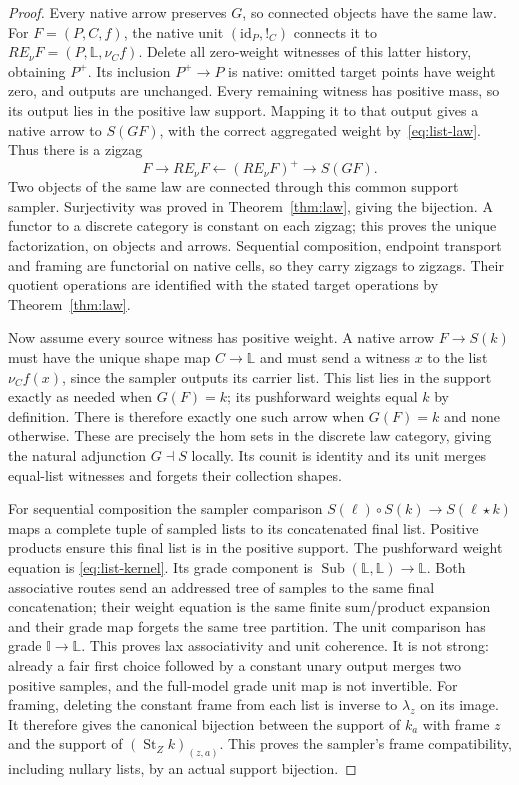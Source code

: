\documentclass[11pt,a4paper]{article}
\theoremstyle{definition}
\newcommand{\id}{\mathrm{id}}
\newcommand{\st}{\operatorname{St}}
\newcommand{\Sub}{\operatorname{Sub}}
\begin{document}
\begin{proof}
Every native arrow preserves $G$, so connected objects have the same law.
For $F=(P,C,f)$, the native unit $(\id_P,!_C)$ connects it to
$R E_\nu F=(P,\mathbb L,\nu_Cf)$.
Delete all zero-weight witnesses of this latter history, obtaining $P^+$.
Its inclusion $P^+\to P$ is native: omitted target points have weight
zero, and outputs are unchanged. Every remaining witness has positive
mass, so its output lies in the positive law support. Mapping it to that
output gives a native arrow to $S(GF)$, with the correct aggregated weight
by~\eqref{eq:list-law}. Thus there is a zigzag
\[
 F\longrightarrow R E_\nu F
       \longleftarrow (R E_\nu F)^+
       \longrightarrow S(GF).
\]
Two objects of the same law are connected through this common support
sampler. Surjectivity was proved in Theorem~\ref{thm:law}, giving the
bijection. A functor to a discrete category is constant on each zigzag;
this proves the unique factorization, on objects and arrows. Sequential
composition, endpoint transport and framing are functorial on native cells,
so they carry zigzags to zigzags. Their quotient operations are identified
with the stated target operations by Theorem~\ref{thm:law}.

Now assume every source witness has positive weight. A native arrow
$F\to S(k)$ must have the unique shape map $C\to\mathbb L$ and must send
a witness $x$ to the list $\nu_Cf(x)$, since the sampler outputs its carrier
list. This list lies in the support exactly as needed when $G(F)=k$;
its pushforward weights equal $k$ by definition. There is therefore exactly
one such arrow when $G(F)=k$ and none otherwise. These are precisely the
hom sets in the discrete law category, giving the natural adjunction
$G\dashv S$ locally. Its counit is identity and its unit merges equal-list
witnesses and forgets their collection shapes.

For sequential composition the sampler comparison
$S(\ell)\circ S(k)\to S(\ell\star k)$ maps a complete tuple of sampled
lists to its concatenated final list. Positive products ensure this final
list is in the positive support. The pushforward weight equation is
\eqref{eq:list-kernel}. Its grade component is
$\Sub(\mathbb L,\mathbb L)\to\mathbb L$. Both associative routes send
an addressed tree of samples to the same final concatenation; their weight
equation is the same finite sum/product expansion and their grade map
forgets the same tree partition. The unit comparison has grade
$\mathbb I\to\mathbb L$. This proves lax associativity and unit coherence.
It is not strong: already a fair first choice followed by a constant unary
output merges two positive samples, and the full-model grade unit map is
not invertible. For framing, deleting the constant frame from each list
is inverse to $\lambda_z$ on its image. It therefore gives the canonical
bijection between the support of $k_a$ with frame $z$ and the support of
$(\st_Zk)_{(z,a)}$. This proves the sampler's frame compatibility, including
nullary lists, by an actual support bijection.


\end{proof}
\end{document}

